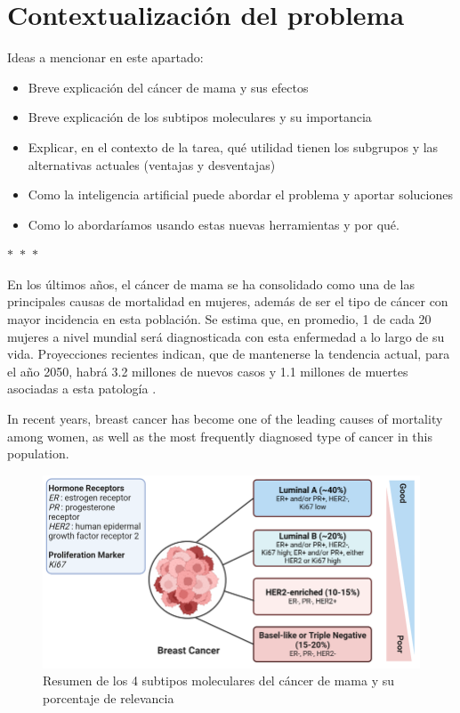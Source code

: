 \documentclass[a4paper,10pt]{book}
\begin{document}
\section{Contextualización del problema}


Ideas a mencionar en este apartado:

\begin{itemize}
  \item Breve explicación del cáncer de mama y sus efectos
  \item Breve explicación de los subtipos moleculares y su importancia
  \item Explicar, en el contexto de la tarea, qué utilidad tienen los subgrupos y las alternativas actuales (ventajas y desventajas)
  \item Como la inteligencia artificial puede abordar el problema y aportar soluciones
  \item Como lo abordaríamos usando estas nuevas herramientas y por qué.
\end{itemize}

\begin{center}
  $\ast$~$\ast$~$\ast$
\end{center}

En los últimos años, el cáncer de mama se ha consolidado como una de las principales causas de mortalidad en mujeres, además de ser el tipo de cáncer con mayor incidencia en esta población. Se estima que, en promedio, 1 de cada 20 mujeres a nivel mundial será diagnosticada con esta enfermedad a lo largo de su vida. Proyecciones recientes indican, que de mantenerse la tendencia actual, para el año 2050, habrá 3.2 millones de nuevos casos y 1.1 millones de muertes asociadas a esta patología \cite{kim_global_2025}.

In recent years, breast cancer has become one of the leading causes of mortality among women, as well as the most frequently diagnosed type of cancer in this population.



\begin{figure}
    \centering
    \includegraphics[width=0.8\linewidth]{reports/assets/subtypes.png}
    \caption{Resumen de los 4 subtipos moleculares del cáncer de mama y su porcentaje de relevancia \cite{harnessing_2024}}
    \label{fig:subtypes}
\end{figure}
\end{document}
